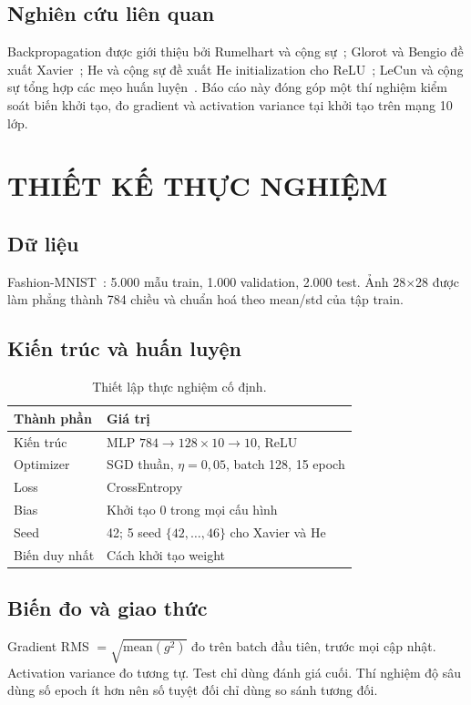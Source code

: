 \documentclass[12pt,a4paper]{report}
\begin{document}
\section{Nghiên cứu liên quan}
Backpropagation được giới thiệu bởi Rumelhart và cộng sự~\cite{rumelhart}; Glorot và Bengio đề xuất Xavier~\cite{glorot}; He và cộng sự đề xuất He initialization cho ReLU~\cite{he}; LeCun và cộng sự tổng hợp các mẹo huấn luyện~\cite{lecun}. Báo cáo này đóng góp một thí nghiệm kiểm soát biến khởi tạo, đo gradient và activation variance tại khởi tạo trên mạng 10 lớp.

\chapter{THIẾT KẾ THỰC NGHIỆM}
\section{Dữ liệu}
Fashion-MNIST~\cite{fmnist}: 5.000 mẫu train, 1.000 validation, 2.000 test. Ảnh 28$\times$28 được làm phẳng thành 784 chiều và chuẩn hoá theo mean/std của tập train.

\section{Kiến trúc và huấn luyện}
\begin{table}[htbp]
\centering
\begin{tabular}{ll}
\toprule
Thành phần & Giá trị \\
\midrule
Kiến trúc & MLP $784\to128\times10\to10$, ReLU \\
Optimizer & SGD thuần, $\eta=0{,}05$, batch 128, 15 epoch \\
Loss & CrossEntropy \\
Bias & Khởi tạo 0 trong mọi cấu hình \\
Seed & 42; 5 seed $\{42,\dots,46\}$ cho Xavier và He \\
Biến duy nhất & Cách khởi tạo weight \\
\bottomrule
\end{tabular}
\caption{Thiết lập thực nghiệm cố định.}
\label{tab:setup}
\end{table}

\section{Biến đo và giao thức}
Gradient RMS $=\sqrt{\mathrm{mean}(g^2)}$ đo trên batch đầu tiên, trước mọi cập nhật. Activation variance đo tương tự. Test chỉ dùng đánh giá cuối. Thí nghiệm độ sâu dùng số epoch ít hơn nên số tuyệt đối chỉ dùng so sánh tương đối.
\end{document}
